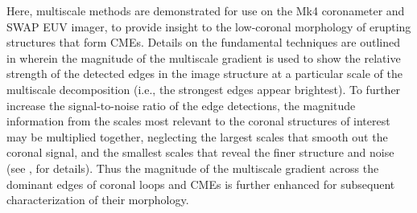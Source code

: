 \documentclass[namedreferences]{solarphysics}
\begin{document}
\begin{article}
Here, multiscale methods are demonstrated for use on the Mk4 coronameter and SWAP EUV imager, to provide insight to the low-coronal morphology of erupting structures that form CMEs. Details on the fundamental techniques are outlined in  wherein the magnitude of the multiscale gradient is used to show the relative strength of the detected edges in the image structure at a particular scale of the multiscale decomposition (i.e., the strongest edges appear brightest). To further increase the signal-to-noise ratio of the edge detections, the magnitude information from the scales most relevant to the coronal structures of interest may be multiplied together, neglecting the largest scales that smooth out the coronal signal, and the smallest scales that reveal the finer structure and noise (see , for details). Thus the magnitude of the multiscale gradient across the dominant edges of coronal loops and CMEs is further enhanced for subsequent characterization of their morphology. 


\end{article}
\end{document}
